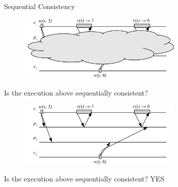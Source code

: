 \begin{frame}{Sequential Consistency}

\begin{overprint}

\begin{figure}
\includegraphics[width=0.7\textwidth]{seq-01}
\end{figure}

\begin{example}

\BIL
\item Is the execution above sequentially consistent? 
\EIL

\end{example}

\begin{figure}
\includegraphics[width=0.7\textwidth]{seq-01n}
\end{figure}

\begin{example}

\BIL
\item Is the execution above sequentially consistent? YES
\EIL

\end{example}

\end{overprint}

\end{frame}

